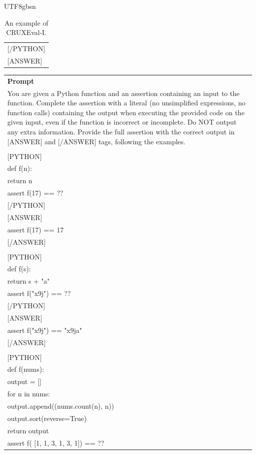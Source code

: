 \documentclass[11pt, a4paper, logo, copyright, nonumbering]{deepseek}
\begin{document}
\begin{CJK*}{UTF8}{gbsn}
\begin{table}[ht]
\begin{tabular}{p{12cm}}
[/PYTHON]\\

[ANSWER]\\
\bottomrule
\end{tabular}
    \caption{\centering An example of CRUXEval-I.}
    \label{tab:CRUXEval_I_eval_format_example}
\end{table}

\begin{table}[ht]
    \centering \small
\begin{tabular}{p{12cm}}
\toprule
\textbf{Prompt}\\
You are given a Python function and an assertion containing an input to the function. Complete the assertion with a literal (no unsimplified expressions, no function calls) containing the output when executing the provided code on the given input, even if the function is incorrect or incomplete. Do NOT output any extra information. Provide the full assertion with the correct output in 
[ANSWER] and 
[/ANSWER] tags, following the examples.\\
\\

[PYTHON]\\
def f(n):\\
    return n\\
assert f(17) == ??\\

[/PYTHON]\\

[ANSWER]\\
assert f(17) == 17\\

[/ANSWER]\\
\\

[PYTHON]\\
def f(s):\\
    return s + "a"\\
assert f("x9j") == ??\\

[/PYTHON]\\

[ANSWER]\\
assert f("x9j") == "x9ja"\\

[/ANSWER]\\
\\

[PYTHON]\\
def f(nums):\\
    output = 
[]\\
    for n in nums:\\
        output.append((nums.count(n), n))\\
    output.sort(reverse=True)\\
    return output\\
assert f(
[1, 1, 3, 1, 3, 1]) == ??\\


\end{tabular}
\end{table}
\end{CJK*}
\end{document}
